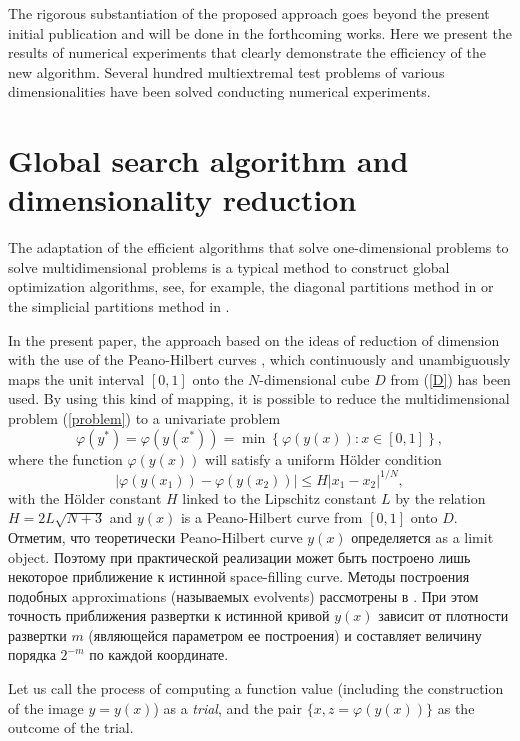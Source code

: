 \documentclass[runningheads]{llncs}
\begin{document}
The rigorous substantiation of the proposed approach goes beyond the present initial publication and will be done in the forthcoming works. Here we present the results of numerical experiments that clearly demonstrate the efficiency of the new algorithm. Several hundred multiextremal test problems of various dimensionalities have been solved conducting numerical experiments.

\section{Global search algorithm and dimensionality reduction}

The adaptation of the efficient algorithms that solve one-dimensional problems to solve multidimensional problems is a typical method to construct global optimization algorithms, see, for example, the diagonal partitions method in \cite{Sergeyev2006} or the simplicial partitions method in \cite{Zilinskas2008}.

In the present paper, the approach based on the ideas of reduction of dimension with the use of the Peano-Hilbert curves \cite{Sergeyev2013,Strongin2000}, which continuously and unambiguously maps the unit interval $[0,1]$ onto the $N$-dimensional cube $D$ from (\ref{D}) has been used. By using this kind of mapping, it is possible to reduce the multidimensional problem (\ref{problem}) to a univariate problem
\[
\varphi(y^\ast)=\varphi(y(x^\ast))=\min{\left\{\varphi(y(x)): x\in[0,1]\right\}},
\]
where the function $\varphi(y(x))$ will satisfy a uniform H{\"o}lder condition
\[
\left|\varphi(y(x_1))-\varphi(y(x_2))\right|\leq H\left|x_1-x_2\right|^{1/N},
\]
with the H{\"o}lder constant $H$ linked to the Lipschitz constant $L$ by the relation
$ H=2 L \sqrt{N+3}$ and $y(x)$ is a Peano-Hilbert curve from $[0,1]$ onto $D$.
Отметим, что теоретически Peano-Hilbert curve $y(x)$ определяется as a limit object. Поэтому при практической реализации может быть построено лишь некоторое приближение к истинной space-filling curve. Методы построения подобных approximations (называемых evolvents) рассмотрены в \cite{Sergeyev2013,Strongin2000}. При этом точность приближения развертки к истинной кривой $y(x)$ зависит от плотности развертки $m$ (являющейся параметром ее построения) и составляет величину порядка $2^{-m}$ по каждой координате.

Let us call the process of computing a function value (including the construction of the image $y=y(x)$) as a \textit{trial}, and the pair $\{x, z = \varphi(y(x))\}$ as the outcome of the trial.
\end{document}
